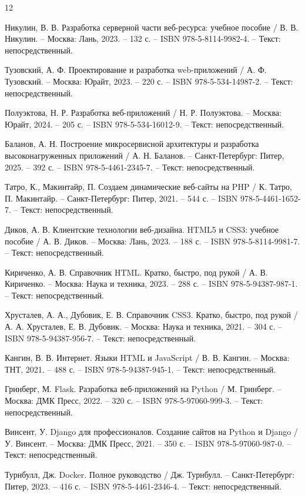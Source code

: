 
\begin{thebibliography}{12}
	
	Никулин, В. В. 
	Разработка серверной части веб-ресурса: учебное пособие / В. В. Никулин. 
	– Москва: Лань, 2023. – 132 с. – ISBN 978-5-8114-9982-4. – Текст: непосредственный.
	
	Тузовский, А. Ф. 
	Проектирование и разработка web-приложений / А. Ф. Тузовский. 
	– Москва: Юрайт, 2023. – 220 с. – ISBN 978-5-534-14987-2. – Текст: непосредственный.
	
	Полуэктова, Н. Р. 
	Разработка веб-приложений / Н. Р. Полуэктова. 
	– Москва: Юрайт, 2024. – 205 с. – ISBN 978-5-534-16012-9. – Текст: непосредственный.
	
	Баланов, А. Н. 
	Построение микросервисной архитектуры и разработка высоконагруженных приложений / А. Н. Баланов. 
	– Санкт-Петербург: Питер, 2025. – 392 с. – ISBN 978-5-4461-2345-7. – Текст: непосредственный.
	
	Татро, К., Макинтайр, П. 
	Создаем динамические веб-сайты на PHP / К. Татро, П. Макинтайр. 
	– Санкт-Петербург: Питер, 2021. – 544 с. – ISBN 978-5-4461-1652-7. – Текст: непосредственный.
	
	Диков, А. В. 
	Клиентские технологии веб-дизайна. HTML5 и CSS3: учебное пособие / А. В. Диков. 
	– Москва: Лань, 2023. – 188 с. – ISBN 978-5-8114-9981-7. – Текст: непосредственный.
	
	Кириченко, А. В. 
	Справочник HTML. Кратко, быстро, под рукой / А. В. Кириченко. 
	– Москва: Наука и техника, 2023. – 288 с. – ISBN 978-5-94387-987-1. – Текст: непосредственный.
	
	Хрусталев, А. А., Дубовик, Е. В. 
	Справочник CSS3. Кратко, быстро, под рукой / А. А. Хрусталев, Е. В. Дубовик. 
	– Москва: Наука и техника, 2021. – 304 с. – ISBN 978-5-94387-956-7. – Текст: непосредственный.
	
	Кангин, В. В. 
	Интернет. Языки HTML и JavaScript / В. В. Кангин. 
	– Москва: ТНТ, 2021. – 488 с. – ISBN 978-5-94387-945-1. – Текст: непосредственный.
	
	Гринберг, М. 
	Flask. Разработка веб-приложений на Python / М. Гринберг. 
	– Москва: ДМК Пресс, 2022. – 320 с. – ISBN 978-5-97060-999-3. – Текст: непосредственный.
	
	Винсент, У. 
	Django для профессионалов. Создание сайтов на Python и Django / У. Винсент. 
	– Москва: ДМК Пресс, 2021. – 350 с. – ISBN 978-5-97060-987-0. – Текст: непосредственный.
	
	Турнбулл, Дж. 
	Docker. Полное руководство / Дж. Турнбулл. 
	– Санкт-Петербург: Питер, 2023. – 416 с. – ISBN 978-5-4461-2346-4. – Текст: непосредственный.
	
\end{thebibliography}